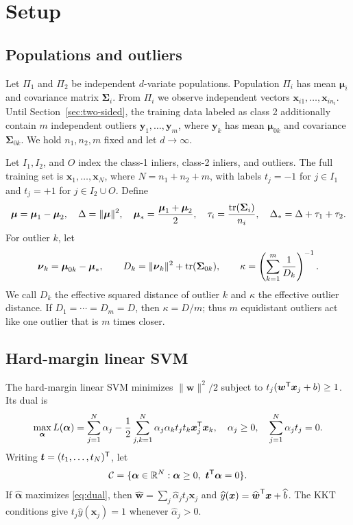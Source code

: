 \section{Setup}
\subsection{Populations and outliers}

Let $\Pi_1$ and $\Pi_2$ be independent $d$-variate populations. Population $\Pi_i$ has mean $\boldsymbol\mu_i$ and covariance matrix $\boldsymbol\Sigma_i$. From $\Pi_i$ we observe independent vectors $\boldsymbol x_{i1},\ldots,\boldsymbol x_{in_i}$. Until Section~\ref{sec:two-sided}, the training data labeled as class 2 additionally contain $m$ independent outliers $\boldsymbol y_1,\ldots,\boldsymbol y_m$, where $\boldsymbol y_k$ has mean $\boldsymbol\mu_{0k}$ and covariance $\boldsymbol\Sigma_{0k}$. We hold $n_1,n_2,m$ fixed and let $d\to\infty$.

Let $I_1,I_2$, and $O$ index the class-1 inliers, class-2 inliers, and outliers. The full training set is $\boldsymbol x_1,\ldots,\boldsymbol x_N$, where $N=n_1+n_2+m$, with labels $t_j=-1$ for $j\in I_1$ and $t_j=+1$ for $j\in I_2\cup O$. Define
\begin{equation}
\boldsymbol\mu=\boldsymbol\mu_1-\boldsymbol\mu_2,\quad
\Delta=\lVert\boldsymbol\mu\rVert^2,\quad
\boldsymbol\mu_*=\frac{\boldsymbol\mu_1+\boldsymbol\mu_2}{2},\quad
\tau_i=\frac{\operatorname{tr}(\boldsymbol\Sigma_i)}{n_i},\quad
\Delta_*=\Delta+\tau_1+\tau_2.
\end{equation}
For outlier $k$, let
\begin{equation}
\boldsymbol\nu_k=\boldsymbol\mu_{0k}-\boldsymbol\mu_*,\qquad
D_k=\lVert\boldsymbol\nu_k\rVert^2+\operatorname{tr}(\boldsymbol\Sigma_{0k}),\qquad
\kappa=\left(\sum_{k=1}^{m}\frac{1}{D_k}\right)^{-1}.
\end{equation}
We call $D_k$ the effective squared distance of outlier $k$ and $\kappa$ the effective outlier distance. If $D_1=\cdots=D_m=D$, then $\kappa=D/m$; thus $m$ equidistant outliers act like one outlier that is $m$ times closer.

\subsection{Hard-margin linear SVM}
The hard-margin linear SVM minimizes $\lVert\boldsymbol w\rVert^2/2$ subject to $t_j(\boldsymbol w^{\mathsf{T}}\boldsymbol x_j+b)\ge1$. Its dual is
\begin{equation}\label{eq:dual}
\max_{\boldsymbol\alpha}
L(\boldsymbol\alpha)=\sum_{j=1}^{N}\alpha_j-\frac12\sum_{j,k=1}^{N}\alpha_j\alpha_k t_jt_k\boldsymbol x_j^{\mathsf{T}}\boldsymbol x_k,
\quad
\alpha_j\ge0,
\quad
\sum_{j=1}^{N}\alpha_jt_j=0.
\end{equation}
Writing $\boldsymbol t=(t_1,\ldots,t_N)^{\mathsf{T}}$, let
\[
\cC=\{\boldsymbol\alpha\in\R^N:\boldsymbol\alpha\ge0,\ \boldsymbol t^\T\boldsymbol\alpha=0\}.
\]
If $\widehat{\boldsymbol\alpha}$ maximizes \eqref{eq:dual}, then
$\widehat{\boldsymbol w}=\sum_j\widehat\alpha_jt_j\boldsymbol x_j$ and
$\widehat y(\boldsymbol x)=\widehat{\boldsymbol w}^{\mathsf{T}}\boldsymbol x+\widehat b$.
The KKT conditions give $t_j\widehat y(\boldsymbol x_j)=1$ whenever $\widehat\alpha_j>0$.

